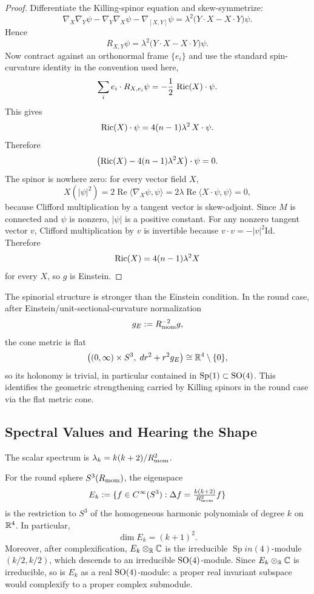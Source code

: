 \documentclass[11pt]{article}
\begin{document}
\begin{proof}
Differentiate the Killing-spinor equation and skew-symmetrize:
\[
\nabla_X\nabla_Y\psi-\nabla_Y\nabla_X\psi-\nabla_{[X,Y]}\psi
=
\lambda^2\bigl(Y\cdot X-X\cdot Y\bigr)\psi.
\]
Hence
\[
R_{X,Y}\psi=\lambda^2\bigl(Y\cdot X-X\cdot Y\bigr)\psi.
\]
Now contract against an orthonormal frame $\{e_i\}$ and use the standard
spin-curvature identity in the convention used here,
\[
\sum_i e_i\cdot R_{X,e_i}\psi=-\frac12\,\operatorname{Ric}(X)\cdot\psi.
\]
This gives
\[
\operatorname{Ric}(X)\cdot\psi=4(n-1)\lambda^2\,X\cdot\psi.
\]
Therefore
\[
\bigl(\operatorname{Ric}(X)-4(n-1)\lambda^2 X\bigr)\cdot\psi=0.
\]
The spinor is nowhere zero: for every vector field $X$,
\[
X(|\psi|^2)=2\operatorname{Re}\langle \nabla_X\psi,\psi\rangle
=2\lambda\operatorname{Re}\langle X\cdot\psi,\psi\rangle=0,
\]
because Clifford multiplication by a tangent vector is skew-adjoint. Since $M$ is
connected and $\psi$ is nonzero, $|\psi|$ is a positive constant. For any nonzero
tangent vector $v$, Clifford multiplication by $v$ is invertible because
$v\cdot v=-|v|^2\mathrm{Id}$. Therefore
\[
\operatorname{Ric}(X)=4(n-1)\lambda^2 X
\]
for every $X$, so $g$ is Einstein.
\end{proof}

\begin{remark}
The spinorial structure is stronger than the Einstein condition. In the round
case, after Einstein/unit-sectional-curvature normalization
\[
g_E:=R_{\mathrm{mom}}^{-2}g,
\]
the cone metric is flat
\[
\bigl((0,\infty)\times S^3,\; dr^2+r^2 g_E\bigr)\cong \mathbb{R}^4\setminus\{0\},
\]
so its holonomy is trivial, in particular contained in $\mathrm{Sp}(1) \subset\mathrm{SO}(4)$.
This identifies the geometric strengthening carried by Killing spinors in the round case via the flat metric cone.
\end{remark}

\subsection{Spectral Values and Hearing the Shape}
\label{p1:der:spectral-values}
The scalar spectrum is $\lambda_k = k(k+2)/R_{\mathrm{mom}}^2$.
\begin{proposition}
\label{p1:prop:symmetry-scalar-multiplicity}
For the round sphere $S^3(R_{\mathrm{mom}})$, the eigenspace
\[
E_k:=\{f\in C^\infty(S^3): \Delta f=\tfrac{k(k+2)}{R_{\mathrm{mom}}^2}f\}
\]
is the restriction to $S^3$ of the homogeneous harmonic polynomials of degree
$k$ on $\mathbb{R}^4$. In particular,
\[
\dim E_k=(k+1)^2.
\]
Moreover, after complexification, $E_k\otimes_{\mathbb{R}}\mathbb{C}$ is the irreducible $\operatorname{Sp}in(4)$-module $(k/2,k/2)$, which descends to an irreducible $\mathrm{SO}(4)$-module. Since $E_k\otimes_{\mathbb{R}}\mathbb{C}$ is irreducible, so is $E_k$ as a real $\mathrm{SO}(4)$-module: a proper real invariant subspace would complexify to a proper complex submodule.
\end{proposition}
\end{document}

